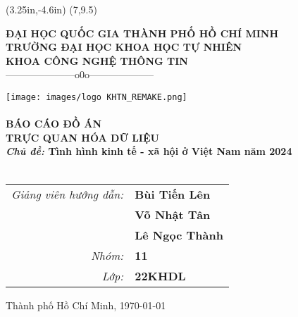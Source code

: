 \documentclass[a4paper]{report}
\begin{document}
\pagestyle{fancy}
\fancyhf{}
\cfoot{\thepage} %


\thisfancyput(3.25in,-4.6in)
{\setlength{\unitlength}{1in}\fancyoval(7,9.5)}

\pagestyle{fancy}





\begin{titlepage} 

\begin{center}

{\large\bf ĐẠI HỌC QUỐC GIA THÀNH PHỐ HỒ CHÍ MINH}\\
{\large\bf TRƯỜNG ĐẠI HỌC KHOA HỌC TỰ NHIÊN}\\
{\large\bf KHOA CÔNG NGHỆ THÔNG TIN} \\[0.5cm]

{———————o0o——————–}

\texttt{[image: images/logo KHTN\_REMAKE.png]}\\[0.5cm]

\hrulefill\\[0.25cm]
{\large\bf BÁO CÁO ĐỒ ÁN}\\[0.25cm]

{\LARGE\bf \textbf{TRỰC QUAN HÓA DỮ LIỆU}}\\[1cm]

{\large\bf {\it Chủ đề:} Tình hình kinh tế - xã hội ở Việt Nam năm 2024}\\
\hrulefill\\[2cm]

\begin{tabular}{r l}
{\large \it Giảng viên hướng dẫn:} & {\large\bf Bùi Tiến Lên} \\ 
& {\large\bf Võ Nhật Tân} \\ 
& {\large\bf Lê Ngọc Thành} \\[0.5cm]
{\large \it Nhóm:} & {\large\bf 11} \\[0.5cm]
{\large \it Lớp:} & {\large\bf 22KHDL}
\end{tabular}
\vfill
{\large Thành phố Hồ Chí Minh, \MakeLowercase{\today}}
\end{center}
\end{titlepage}


\tableofcontents

\newpage
{}
\end{document}
